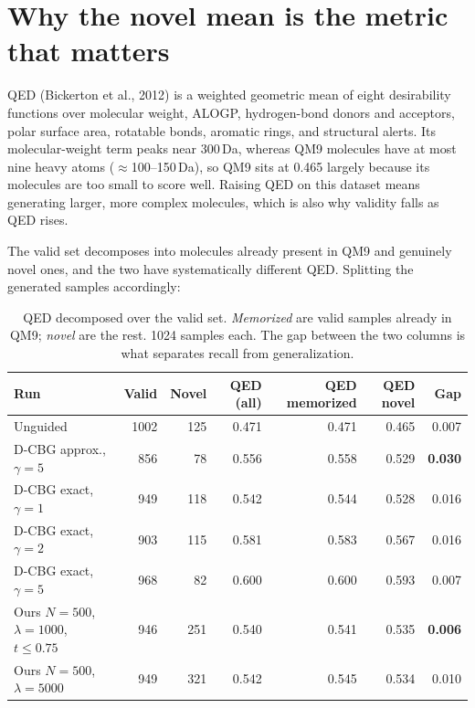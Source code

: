 \documentclass[11pt]{article}
\begin{document}
\section{Why the novel mean is the metric that matters}
\label{sec:novel}

QED (Bickerton et al., 2012) is a weighted geometric mean of eight desirability
functions over molecular weight, ALOGP, hydrogen-bond donors and acceptors,
polar surface area, rotatable bonds, aromatic rings, and structural alerts. Its
molecular-weight term peaks near 300\,Da, whereas QM9 molecules have at most
nine heavy atoms ($\approx$100--150\,Da), so QM9 sits at 0.465 largely because
its molecules are too small to score well. Raising QED on this dataset means
generating larger, more complex molecules, which is also why validity falls as
QED rises.

The valid set decomposes into molecules already present in QM9 and genuinely
novel ones, and the two have systematically different QED. Splitting the
generated samples accordingly:

\begin{table}[h]
\centering
\caption{QED decomposed over the valid set. \emph{Memorized} are valid samples
already in QM9; \emph{novel} are the rest. 1024 samples each. The gap between
the two columns is what separates recall from generalization.}
\label{tab:novel}
\begin{tabular}{lrrrrrr}
\toprule
Run & Valid & Novel & QED (all) & QED memorized & QED novel & Gap \\
\midrule
Unguided                                   & 1002 & 125 & 0.471 & 0.471 & 0.465 & 0.007 \\
D-CBG approx., $\gamma = 5$                & 856  & 78  & 0.556 & 0.558 & 0.529 & \textbf{0.030} \\
D-CBG exact, $\gamma = 1$                  & 949  & 118 & 0.542 & 0.544 & 0.528 & 0.016 \\
D-CBG exact, $\gamma = 2$                  & 903  & 115 & 0.581 & 0.583 & 0.567 & 0.016 \\
D-CBG exact, $\gamma = 5$                  & 968  & 82  & 0.600 & 0.600 & 0.593 & 0.007 \\
Ours $N{=}500$, $\lambda{=}1000$, $t \le 0.75$ & 946 & 251 & 0.540 & 0.541 & 0.535 & \textbf{0.006} \\
Ours $N{=}500$, $\lambda{=}5000$           & 949  & 321 & 0.542 & 0.545 & 0.534 & 0.010 \\
\bottomrule
\end{tabular}
\end{table}
\end{document}
